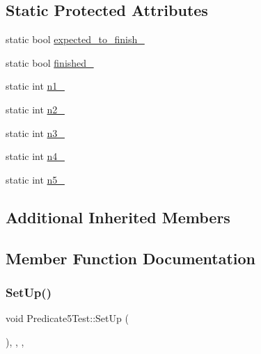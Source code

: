 \subsection*{Static Protected Attributes}
\begin{DoxyCompactItemize}
\item 
static bool \mbox{\hyperlink{class_predicate5_test_aa502b7a330cc5c64785ff59aad3ef180}{expected\+\_\+to\+\_\+finish\+\_\+}}
\item 
static bool \mbox{\hyperlink{class_predicate5_test_a5003aada64accf06cdb28b1ff1797353}{finished\+\_\+}}
\item 
static int \mbox{\hyperlink{class_predicate5_test_a356c8e361185b234a417ed895eb14e38}{n1\+\_\+}}
\item 
static int \mbox{\hyperlink{class_predicate5_test_a5bf48ba65b7baf20abe1d2af90779ce0}{n2\+\_\+}}
\item 
static int \mbox{\hyperlink{class_predicate5_test_a63723efb915dbf418c31b97b64dabc0e}{n3\+\_\+}}
\item 
static int \mbox{\hyperlink{class_predicate5_test_a5d66aa58badddc8d3d8070a93c0558d6}{n4\+\_\+}}
\item 
static int \mbox{\hyperlink{class_predicate5_test_a96badba6366235a2771b27ea014bd9ce}{n5\+\_\+}}
\end{DoxyCompactItemize}
\subsection*{Additional Inherited Members}


\subsection{Member Function Documentation}
\mbox{\label{class_predicate5_test_a699fbdc25f5eeb2e810887a60a4b3c1b}} 
\subsubsection{\texorpdfstring{SetUp()}{SetUp()}\hspace{0.1cm}{\footnotesize\ttfamily [1/3]}}
{\footnotesize\ttfamily void Predicate5\+Test\+::\+Set\+Up (\begin{DoxyParamCaption}{ }\end{DoxyParamCaption})\hspace{0.3cm}{\ttfamily [inline]}, {\ttfamily [override]}, {\ttfamily [protected]}, {\ttfamily [virtual]}}




